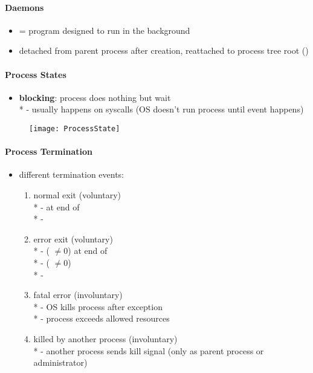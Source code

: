 \paragraph{Daemons}
\begin{itemize}
  \item = program designed to run in the background
  \item detached from parent process after creation, reattached to process tree root ()
\end{itemize}

\paragraph{Process States}
\begin{itemize}
  \item \textbf{blocking}: process does nothing but wait \\*
    - usually happens on syscalls (OS doesn't run process until event happens)
\end{itemize}

\begin{figure}[h]\centering\label{ProcessState}\texttt{[image: ProcessState]}\end{figure}

\paragraph{Process Termination}
\begin{itemize}
  \item different termination events: 
  \begin{enumerate}
    \item normal exit (voluntary) \\*
      -  at end of  \\*
      - 
    \item error exit (voluntary) \\*
      -  ( \( \neq 0 \)) at end of  \\*
      -  ( \( \neq 0 \)) \\*
      - 
    \item fatal error (involuntary) \\*
      - OS kills process after exception \\*
      - process exceeds allowed resources
    \item killed by another process (involuntary) \\*
      - another process sends kill signal (only as parent process or administrator)
  \end{enumerate}
\end{itemize}

